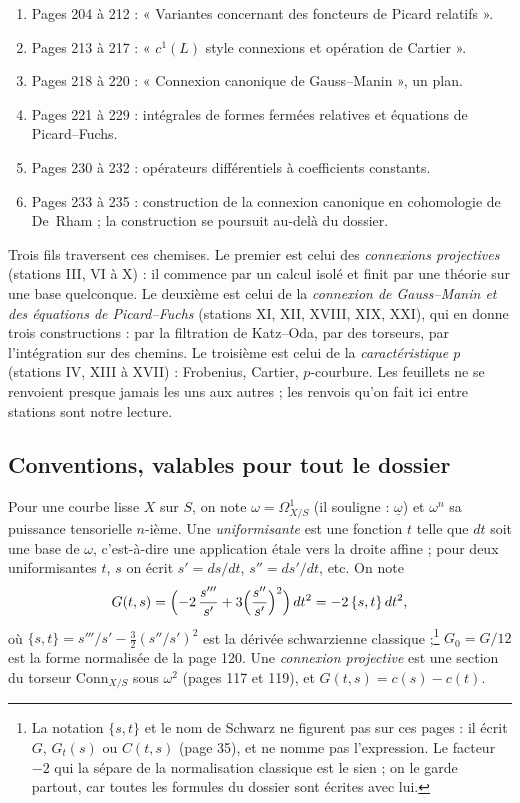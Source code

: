\documentclass[11pt,a4paper]{article}
\begin{document}
\begin{enumerate}
  propres de Frobenius (« Fin de parenthèse »).
  \item[XVI.] Pages 204 à 212 : « Variantes concernant des foncteurs de
  Picard relatifs ».
  \item[XVII.] Pages 213 à 217 : « $c^1(L)$ style connexions et opération de
  Cartier ».
  \item[XVIII.] Pages 218 à 220 : « Connexion canonique de Gauss--Manin »,
  un plan.
  \item[XIX.] Pages 221 à 229 : intégrales de formes fermées relatives et
  équations de Picard--Fuchs.
  \item[XX.] Pages 230 à 232 : opérateurs différentiels à coefficients
  constants.
  \item[XXI.] Pages 233 à 235 : construction de la connexion canonique en
  cohomologie de De~Rham ; la construction se poursuit au-delà du dossier.
\end{enumerate}

Trois fils traversent ces chemises. Le premier est celui des
\emph{connexions projectives} (stations III, VI à X) : il commence par un
calcul isolé et finit par une théorie sur une base quelconque. Le deuxième
est celui de la \emph{connexion de Gauss--Manin et des équations de
Picard--Fuchs} (stations XI, XII, XVIII, XIX, XXI), qui en donne trois
constructions : par la filtration de Katz--Oda, par des torseurs, par
l'intégration sur des chemins. Le troisième est celui de la
\emph{caractéristique $p$} (stations IV, XIII à XVII) : Frobenius, Cartier,
$p$-courbure. Les feuillets ne se renvoient presque jamais les uns aux autres ;
les renvois qu'on fait ici entre stations sont notre lecture.

\subsection*{Conventions, valables pour tout le dossier}

Pour une courbe lisse $X$ sur $S$, on note
$\omega = \Omega^1_{X/S}$ (il souligne : $\underline{\omega}$) et $\omega^n$ sa
puissance tensorielle $n$-ième. Une \emph{uniformisante} est une fonction
$t$ telle que $dt$ soit une base de $\omega$, c'est-à-dire une application
étale vers la droite affine ; pour deux uniformisantes $t$, $s$ on écrit
$s' = ds/dt$, $s'' = ds'/dt$, etc. On note
\[
  G(t,s) = \Bigl(-2\,\frac{s'''}{s'} + 3\Bigl(\frac{s''}{s'}\Bigr)^2\Bigr)\,dt^2
  = -2\,\{s,t\}\,dt^2,
\]
où $\{s,t\} = s'''/s' - \tfrac32 (s''/s')^2$ est la dérivée schwarzienne
classique ;\footnote{La notation $\{s,t\}$ et le nom de Schwarz ne figurent
pas sur ces pages : il écrit $G$, $G_t(s)$ ou $C(t,s)$ (page 35), et ne nomme
pas l'expression. Le facteur $-2$ qui la sépare de la normalisation
classique est le sien ; on le garde partout, car toutes les formules du
dossier sont écrites avec lui.} $G_0 = G/12$ est la forme normalisée de la
page 120. Une \emph{connexion projective} est une section du torseur
$\mathrm{Conn}_{X/S}$ sous $\omega^2$ (pages 117 et 119), et
$G(t,s) = c(s) - c(t)$.
\end{document}
